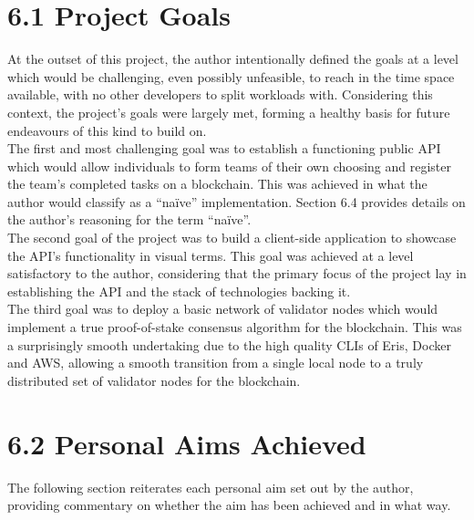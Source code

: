 \documentclass[12pt]{report}
\begin{document}
\section{6.1 Project Goals}\label{project-goals-1}

At the outset of this project, the author intentionally defined the
goals at a level which would be challenging, even possibly unfeasible,
to reach in the time space available, with no other developers to split
workloads with. Considering this context, the project's goals were
largely met, forming a healthy basis for future endeavours of this kind
to build on.\\
The first and most challenging goal was to establish a functioning
public API which would allow individuals to form teams of their own
choosing and register the team's completed tasks on a blockchain. This
was achieved in what the author would classify as a ``naïve''
implementation. Section 6.4 provides details on the author's reasoning
for the term ``naïve''.\\
The second goal of the project was to build a client-side application to
showcase the API's functionality in visual terms. This goal was achieved
at a level satisfactory to the author, considering that the primary
focus of the project lay in establishing the API and the stack of
technologies backing it.\\
The third goal was to deploy a basic network of validator nodes which
would implement a true proof-of-stake consensus algorithm for the
blockchain. This was a surprisingly smooth undertaking due to the high
quality CLIs of Eris, Docker and AWS, allowing a smooth transition from
a single local node to a truly distributed set of validator nodes for
the blockchain.

\section{6.2 Personal Aims Achieved}\label{personal-aims-achieved}

The following section reiterates each personal aim set out by the
author, providing commentary on whether the aim has been achieved and in
what way.
\end{document}
